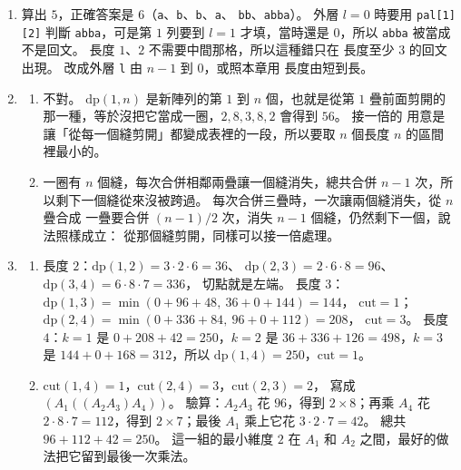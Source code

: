 \begin{enumerate}
\item 算出 $5$，正確答案是 $6$（\texttt{a}、\texttt{b}、\texttt{b}、\texttt{a}、
\texttt{bb}、\texttt{abba}）。 外層 $l = 0$ 時要用 \texttt{pal[1][2]} 判斷
\texttt{abba}，可是第 $1$ 列要到 $l = 1$ 才填，當時還是 $0$，所以
\texttt{abba} 被當成不是回文。 長度 $1$、$2$ 不需要中間那格，所以這種錯只在
長度至少 $3$ 的回文出現。 改成外層 \texttt{l} 由 $n - 1$ 到 $0$，或照本章用
長度由短到長。

\item
\begin{enumerate}
\item 不對。 $\mathrm{dp}(1, n)$ 是新陣列的第 $1$ 到 $n$ 個，也就是從第 $1$
疊前面剪開的那一種，等於沒把它當成一圈，$2, 8, 3, 8, 2$ 會得到 $56$。 接一倍的
用意是讓「從每一個縫剪開」都變成表裡的一段，所以要取 $n$ 個長度 $n$ 的區間
裡最小的。
\item 一圈有 $n$ 個縫，每次合併相鄰兩疊讓一個縫消失，總共合併 $n - 1$ 次，所
以剩下一個縫從來沒被跨過。 每次合併三疊時，一次讓兩個縫消失，從 $n$ 疊合成
一疊要合併 $(n - 1)/2$ 次，消失 $n - 1$ 個縫，仍然剩下一個，說法照樣成立：
從那個縫剪開，同樣可以接一倍處理。
\end{enumerate}

\item
\begin{enumerate}
\item 長度 $2$：$\mathrm{dp}(1, 2) = 3 \cdot 2 \cdot 6 = 36$、
$\mathrm{dp}(2, 3) = 2 \cdot 6 \cdot 8 = 96$、$\mathrm{dp}(3, 4) = 6 \cdot 8 \cdot 7 = 336$，
切點就是左端。 長度 $3$：$\mathrm{dp}(1, 3) = \min(0 + 96 + 48,\ 36 + 0 + 144) = 144$，
$\mathrm{cut} = 1$；$\mathrm{dp}(2, 4) = \min(0 + 336 + 84,\ 96 + 0 + 112) = 208$，
$\mathrm{cut} = 3$。 長度 $4$：$k = 1$ 是 $0 + 208 + 42 = 250$，$k = 2$ 是
$36 + 336 + 126 = 498$，$k = 3$ 是 $144 + 0 + 168 = 312$，所以
$\mathrm{dp}(1, 4) = 250$，$\mathrm{cut} = 1$。
\item $\mathrm{cut}(1, 4) = 1$，$\mathrm{cut}(2, 4) = 3$，$\mathrm{cut}(2, 3) = 2$，
寫成 $(A_1 ((A_2 A_3) A_4))$。 驗算：$A_2 A_3$ 花 $96$，得到 $2 \times 8$；再乘
$A_4$ 花 $2 \cdot 8 \cdot 7 = 112$，得到 $2 \times 7$；最後 $A_1$ 乘上它花
$3 \cdot 2 \cdot 7 = 42$。 總共 $96 + 112 + 42 = 250$。 這一組的最小維度 $2$ 在
$A_1$ 和 $A_2$ 之間，最好的做法把它留到最後一次乘法。
\end{enumerate}


\end{enumerate}
